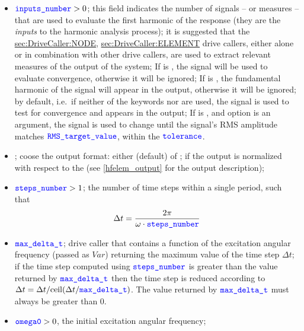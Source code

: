 \begin{itemize}
\item $\textcolor{blue}{\texttt{inputs\_number}} > 0$;
this field indicates the number of signals -- or measures -- that are used to evaluate the first harmonic of the response
(they are the \emph{inputs} to the harmonic analysis process);
it is suggested that the
\hyperref{\kw{node}}{\kw{node} (see Section~}{)}{sec:DriveCaller:NODE},
\hyperref{\kw{element}}{\kw{element} (see Section~}{)}{sec:DriveCaller:ELEMENT}
drive callers, either alone or in combination with other drive callers, are used to extract relevant measures of the output of the system;
If  is , the signal will be used to evaluate convergence, otherwise it will be ignored;
If  is , the fundamental harmonic of the signal will appear in the output, otherwise it will be ignored;
by default, i.e.\ if neither of the keywords  nor  are used, the signal is used to test for convergence and appears in the output;
If  is , and option  is an argument, the signal is used to change  until the signal's RMS amplitude matches $\textcolor{blue}{\texttt{RMS\_target\_value}}$, within the $\textcolor{blue}{\texttt{tolerance}}$.

\item {}; coose the output format: either  (default) of ;
if  the output is normalized with respect to the  (see
\ref{hfelem_output} for the output description);

\item $\textcolor{blue}{\texttt{steps\_number}} > 1$; the number of time steps within a single period, such that
\begin{align*}
	\Delta t = \frac{2 \pi}{\omega \cdot \textcolor{blue}{\texttt{steps\_number}}}
\end{align*}

\item $\textcolor{blue}{\texttt{max\_delta\_t}}$; drive caller that contains a function of the excitation angular frequency (passed as $Var$) returning the maximum value of the time step $\Delta t$; 
if the time step computed using $\textcolor{blue}{\texttt{steps\_number}}$ is greater
than the value returned by $\textcolor{blue}{\texttt{max\_delta\_t}}$ then the time step is reduced according to 
$\Delta t = \Delta t / \mathrm{ceil}(\Delta t / \textcolor{blue}{\texttt{max\_delta\_t}})$. The value returned by $\textcolor{blue}{\texttt{max\_delta\_t}}$ must always be greater than 0.

\item $\textcolor{blue}{\texttt{omega0}} > 0$, the initial excitation angular frequency;


\end{itemize}
